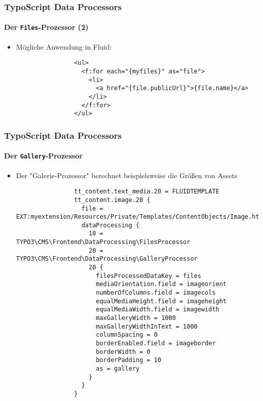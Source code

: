 \begin{frame}[fragile]
	\frametitle{TypoScript Data Processors}
	\framesubtitle{Der \texttt{Files}-Prozessor (2)}

	\lstset{basicstyle=\tiny\ttfamily}

	\begin{itemize}

		\item Mögliche Anwendung in Fluid:

			\begin{lstlisting}
				<ul>
				  <f:for each="{myfiles}" as="file">
				    <li>
				      <a href="{file.publicUrl}">{file.name}</a>
				    </li>
				  </f:for>
				</ul>
			\end{lstlisting}

	\end{itemize}

\end{frame}


\begin{frame}[fragile]
	\frametitle{TypoScript Data Processors}
	\framesubtitle{Der \texttt{Gallery}-Prozessor}

	\lstset{basicstyle=\tiny\ttfamily}

	\begin{itemize}

		\item Der "Galerie-Prozessor" berechnet beispielsweise die Größen von Assets

			\begin{lstlisting}
				tt_content.text_media.20 = FLUIDTEMPLATE
				tt_content.image.20 {
				  file = EXT:myextension/Resources/Private/Templates/ContentObjects/Image.html
				  dataProcessing {
				    10 = TYPO3\CMS\Frontend\DataProcessing\FilesProcessor
				    20 = TYPO3\CMS\Frontend\DataProcessing\GalleryProcessor
				    20 {
				      filesProcessedDataKey = files
				      mediaOrientation.field = imageorient
				      numberOfColumns.field = imagecols
				      equalMediaHeight.field = imageheight
				      equalMediaWidth.field = imagewidth
				      maxGalleryWidth = 1000
				      maxGalleryWidthInText = 1000
				      columnSpacing = 0
				      borderEnabled.field = imageborder
				      borderWidth = 0
				      borderPadding = 10
				      as = gallery
				    }
				  }
				}
			\end{lstlisting}

	\end{itemize}

\end{frame}

